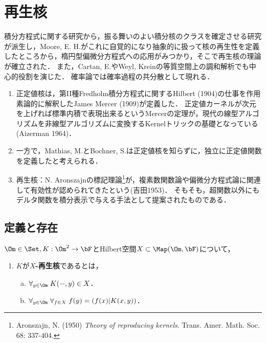 \documentclass[uplatex,dvipdfmx]{jsreport}
\begin{document}
\section{再生核}

\begin{tcolorbox}[colframe=ForestGreen, colback=ForestGreen!10!white,breakable,colbacktitle=ForestGreen!40!white,coltitle=black,fonttitle=\bfseries\sffamily,
title=]
    積分方程式に関する研究から，振る舞いのよい積分核のクラスを確定させる研究が派生し，Moore, E. H.がこれに自覚的になり抽象的に扱って核の再生性を定義したところから，楕円型偏微分方程式への応用がみつかり，そこで再生核の理論が確立された．
    また，Cartan, E.やWeyl, Kreinの等質空間上の調和解析でも中心的役割を演じた．
    確率論では確率過程の共分散として現れる．
\end{tcolorbox}

\begin{history}\mbox{}
    \begin{enumerate}
        \item 正定値核は，第II種Fredholm積分方程式に関するHilbert (1904)の仕事を作用素論的に解釈したJames Mercer (1909)が定義した．
        正定値カーネルが次元を上げれば標準内積で表現出来るというMercerの定理が，現代の線型アルゴリズムを非線型アルゴリズムに変換するKernelトリックの基礎となっている(Aizerman 1964)．
        \item 一方で，Mathias, M.とBochner, S.は正定値核を知らずに，独立に正定値関数を定義したと考えられる．
        \item 再生核：N. Aronszajnの標記理論\footnote{Aronszajn, N. (1950) \textit{Theory of reproducing kernels}. Trans. Amer. Math. Soc. 68: 337-404.}が，複素数関数論や偏微分方程式論に関連して有効性が認められてきたという(吉田1953\cite{吉田})．
        そもそも，超関数以外にもデルタ関数を積分表示で与える手法として提案されたものである．
    \end{enumerate}
\end{history}

\subsection{定義と存在}

\begin{definition}
    $\Om\in\Set,K:\Om^2\to\bF$とHilbert空間$X\subset\Map(\Om,\bF)$について，
    \begin{enumerate}
        \item $K$が\textbf{$X$-再生核}であるとは，
        \begin{enumerate}[(a)]
            \item $\forall_{y\in\Om}\;K(-,y)\in X$．
            \item $\forall_{y\in\Om}\;\forall_{f\in X}\;f(y)=(f(x)|K(x,y))$．
        \end{enumerate}
    \end{enumerate}
\end{definition}
\end{document}
